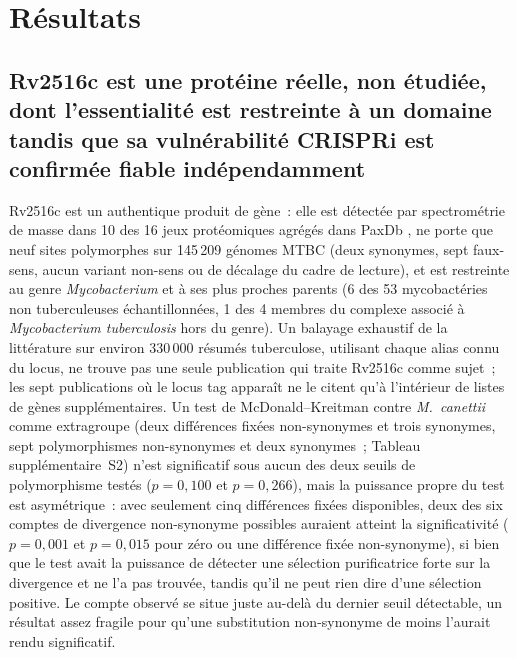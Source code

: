 \documentclass[11pt,a4paper]{article}
\newcommand{\mtb}{\textit{Mycobacterium tuberculosis}}
\begin{document}
\section{Résultats}

\subsection{Rv2516c est une protéine réelle, non étudiée, dont l'essentialité est restreinte à un
domaine tandis que sa vulnérabilité CRISPRi est confirmée fiable indépendamment}

Rv2516c est un authentique produit de gène~: elle est détectée par spectrométrie de masse dans 10
des 16 jeux protéomiques agrégés dans PaxDb \citep{huang2023paxdb}, ne porte que neuf sites
polymorphes sur 145\,209 génomes MTBC (deux synonymes, sept faux-sens, aucun variant non-sens ou de
décalage du cadre de lecture), et est restreinte au genre \textit{Mycobacterium} et à ses plus
proches parents (6 des 53 mycobactéries non tuberculeuses échantillonnées, 1 des 4 membres du
complexe associé à \mtb{} hors du genre). Un balayage exhaustif de la littérature sur environ
330\,000 résumés tuberculose, utilisant chaque alias connu du locus, ne trouve pas une seule
publication qui traite Rv2516c comme sujet~; les sept publications où le locus tag apparaît ne le
citent qu'à l'intérieur de listes de gènes supplémentaires. Un test de McDonald--Kreitman contre
\textit{M.\ canettii} comme extragroupe (deux différences fixées non-synonymes et trois synonymes,
sept polymorphismes non-synonymes et deux synonymes~; Tableau supplémentaire~S2) n'est significatif sous aucun des deux seuils
de polymorphisme testés ($p=0,100$ et $p=0,266$), mais la puissance propre du test est asymétrique~:
avec seulement cinq différences fixées disponibles, deux des six comptes de divergence non-synonyme
possibles auraient atteint la significativité ($p=0,001$ et $p=0,015$ pour zéro ou une différence
fixée non-synonyme), si bien que le test avait la puissance de détecter une sélection purificatrice
forte sur la divergence et ne l'a pas trouvée, tandis qu'il ne peut rien dire d'une sélection
positive. Le compte observé se situe juste au-delà du dernier seuil détectable, un résultat assez
fragile pour qu'une substitution non-synonyme de moins l'aurait rendu significatif.
\end{document}
